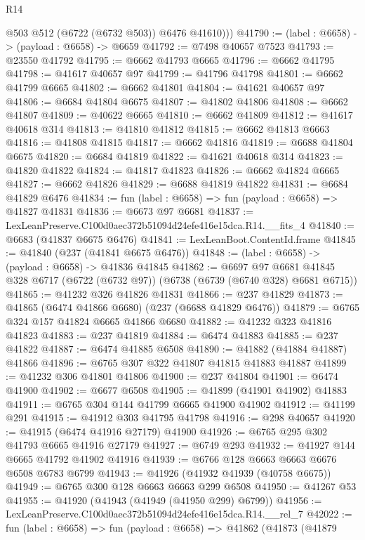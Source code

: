 \begin{lexlean}{R14}
\begin{coremodule}
          @503
          @512
          (@6722 (@6732 @503))
          @6476
          @41610)))
@41790 := (label : @6658) -> (payload : @6658) -> @6659
@41792 := @7498 @40657 @7523
@41793 := @23550 @41792
@41795 := @6662 @41793 @6665
@41796 := @6662 @41795
@41798 := @41617 @40657 @97
@41799 := @41796 @41798
@41801 := @6662 @41799 @6665
@41802 := @6662 @41801
@41804 := @41621 @40657 @97
@41806 := @6684 @41804 @6675
@41807 := @41802 @41806
@41808 := @6662 @41807
@41809 := @40622 @6665
@41810 := @6662 @41809
@41812 := @41617 @40618 @314
@41813 := @41810 @41812
@41815 := @6662 @41813 @6663
@41816 := @41808 @41815
@41817 := @6662 @41816
@41819 := @6688 @41804 @6675
@41820 := @6684 @41819
@41822 := @41621 @40618 @314
@41823 := @41820 @41822
@41824 := @41817 @41823
@41826 := @6662 @41824 @6665
@41827 := @6662 @41826
@41829 := @6688 @41819 @41822
@41831 := @6684 @41829 @6476
@41834 := fun (label : @6658) => fun (payload : @6658) => @41827 @41831
@41836 := @6673 @97 @6681
@41837 := LexLeanPreserve.C100d0aec372b51094d24efe416e15dca.R14.__fits_4
@41840 := @6683 (@41837 @6675 @6476)
@41841 := LexLeanBoot.ContentId.frame
@41845 := @41840 (@237 (@41841 @6675 @6476))
@41848 := (label : @6658) -> (payload : @6658) -> @41836 @41845
@41862 := @6697
    @97
    @6681
    @41845
    @328
    @6717
    (@6722 (@6732 @97))
    (@6738 (@6739 (@6740 @328) @6681 @6715))
@41865 := @41232 @326 @41826 @41831
@41866 := @237 @41829
@41873 := @41865 (@6474 @41866 @6680) (@237 (@6688 @41829 @6476))
@41879 := @6765 @324 @157 @41824 @6665 @41866 @6680
@41882 := @41232 @323 @41816 @41823
@41883 := @237 @41819
@41884 := @6474 @41883
@41885 := @237 @41822
@41887 := @6474 @41885 @6508
@41890 := @41882 (@41884 @41887) @41866
@41896 := @6765 @307 @322 @41807 @41815 @41883 @41887
@41899 := @41232 @306 @41801 @41806
@41900 := @237 @41804
@41901 := @6474 @41900
@41902 := @6677 @6508
@41905 := @41899 (@41901 @41902) @41883
@41911 := @6765 @304 @144 @41799 @6665 @41900 @41902
@41912 := @41199 @291
@41915 := @41912 @303 @41795 @41798
@41916 := @298 @40657
@41920 := @41915 (@6474 @41916 @27179) @41900
@41926 := @6765 @295 @302 @41793 @6665 @41916 @27179
@41927 := @6749 @293
@41932 := @41927 @144 @6665 @41792 @41902 @41916
@41939 := @6766 @128 @6663 @6663 @6676 @6508 @6783 @6799
@41943 := @41926 (@41932 @41939 (@40758 @6675))
@41949 := @6765 @300 @128 @6663 @6663 @299 @6508
@41950 := @41267 @53
@41955 := @41920 (@41943 (@41949 (@41950 @299) @6799))
@41956 := LexLeanPreserve.C100d0aec372b51094d24efe416e15dca.R14.__rel_7
@42022 := fun (label : @6658) =>
  fun (payload : @6658) =>
  @41862
    (@41873
      (@41879

\end{coremodule}
\end{lexlean}
